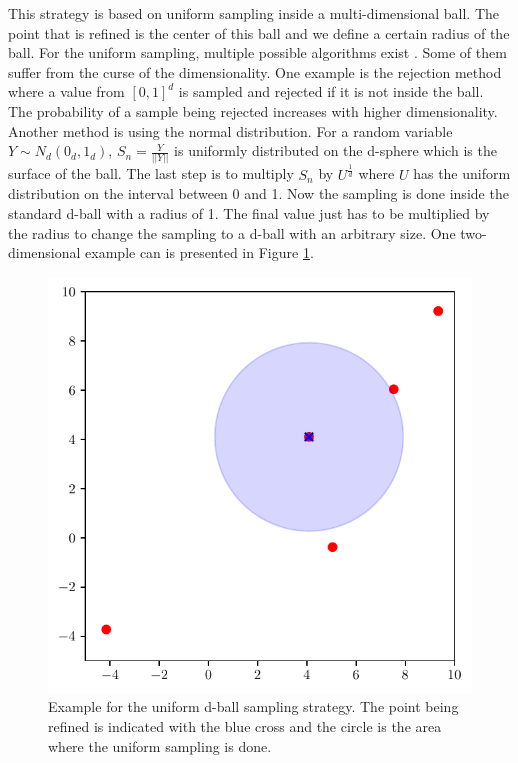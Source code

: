This strategy is based on uniform sampling inside a multi-dimensional ball. The point that is refined is the center of this ball and we define a certain radius of the ball. For the uniform sampling, multiple possible algorithms exist \cite{HARMAN20102297}. Some of them suffer from the curse of the dimensionality. One example is the rejection method where a value from $ [0,1]^d $ is sampled and rejected if it is not inside the ball. The probability of a sample being rejected increases with higher dimensionality. Another method is using the normal distribution. For a random variable $ Y \sim N_d(0_d, 1_d) $, $ S_n = \frac{Y}{|| Y ||} $ is uniformly distributed on the d-sphere which is the surface of the ball. The last step is to multiply $ S_n $ by $ U^{\frac{1}{d}} $ where $ U $ has the uniform distribution on the interval between 0 and 1. Now the sampling is done inside the standard d-ball with a radius of 1. The final value just has to be multiplied by the radius to change the sampling to a d-ball with an arbitrary size. One two-dimensional example can is presented in Figure \ref{fig:alternative_2}.

\begin{figure}[H]
	\centering
	\includegraphics[scale=0.8]{figures/Adaptive_random/Visualizations/Alternative_2}
	\caption{ Example for the uniform d-ball sampling strategy. The point being refined is indicated with the blue cross and the circle is the area where the uniform sampling is done. }
	\label{fig:alternative_2}
\end{figure}

